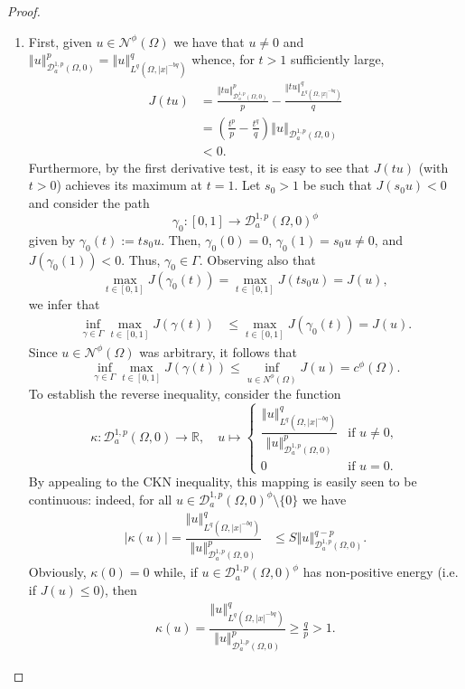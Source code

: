 \documentclass[10pt, reqno]{amsart}
\newcommand{\RR}{\mathbb{R}}
\newcommand{\Om}{\Omega}
\newcommand{\abs}[1]{\left\vert #1 \right\vert}
\newcommand{\norm}[1]{\left\Vert #1 \right\Vert}
\newcommand{\D}{\mathcal{D}}
\newcommand{\N}{\mathcal{N}}
\numberwithin{equation}{section}
\theoremstyle{definition}
\theoremstyle{remark}
\theoremstyle{plain}
\begin{document}
\begin{proof}
\begin{enumerate}[leftmargin=*]
			\item First, given $u \in \N^\phi(\Om)$ we have that $u \ne 0$ and $\norm{u}_{\D^{1,p}_a(\Om,0)}^p = \norm{u}_{L^q(\Om,\abs{x}^{-bq})}^q$ whence, for $t > 1$ sufficiently large, 
			\begin{align*}
				J(tu) &= \frac{\norm{tu}_{\D^{1,p}_a(\Om,0)}^p}{p} - \frac{\norm{tu}_{L^q(\Om,\abs{x}^{-bq})}^q}{q}\\
				&= \left( \frac{t^p}{p} - \frac{t^q}{q}\right) \norm{u}_{\D^{1,p}_a(\Om,0)} \\& < 0.
			\end{align*}
			Furthermore, by the first derivative test, it is easy to see that $J(tu)$ (with $t > 0$) achieves its maximum at $t=1$.
			Let $s_0 > 1$ be such that $J(s_0 u) < 0$ and consider the path $$\gamma_0 : [0,1] \to \D_a^{1,p}(\Om,0)^\phi$$ given by $\gamma_0(t) := ts_0u$. Then, $\gamma_0(0) = 0$, $\gamma_0(1) = s_0 u \ne 0$, and $J(\gamma_0(1)) < 0$. Thus, $\gamma_0 \in \Gamma$. Observing also that
			\[
			\max_{t \in [0,1]} J(\gamma_0(t)) = \max_{t \in [0,1]} J(ts_0u) = J(u), 
			\]
			we infer that
			\begin{align*}
				\inf_{\gamma \in \Gamma} \max_{t \in [0,1]} J(\gamma(t)) &\le \max_{t \in [0,1]} J(\gamma_0(t)) = J(u).
			\end{align*}
			Since $u \in \N^\phi(\Om)$ was arbitrary, it follows that
			\[
			\inf_{\gamma \in \Gamma} \max_{t \in [0,1]} J(\gamma(t))  \le \inf_{u \in N^\phi(\Om)} J(u) = c^\phi(\Om).
			\]
			To establish the reverse inequality, consider the function
			\[
			\kappa : \D_a^{1,p}(\Om,0) \to \RR, \quad u \mapsto \begin{cases} \dfrac{\norm{u}^{q}_{L^q(\Om,\abs{x}^{-bq})}}{\norm{u}^p_{\D^{1,p}_a(\Om,0)}} & \text{if } u \ne 0,\\ 0 & \text{if } u = 0. \end{cases}
			\]	
			By appealing to the CKN inequality, this mapping is easily seen to be continuous: indeed, for all $u \in \D_a^{1,p}(\Om,0)^\phi \setminus \{0\}$ we have
			\begin{align*}
				\abs{\kappa(u)} = \dfrac{\norm{u}^{q}_{L^q(\Om,\abs{x}^{-bq})}}{\norm{u}^p_{\D^{1,p}_a(\Om,0)}} &\le S\norm{u}^{q-p}_{\D^{1,p}_a(\Om,0)}.
			\end{align*}
			Obviously, $\kappa(0) =0$ while, if $u\in \D_a^{1,p}(\Om,0)^\phi$ has non-positive energy (i.e. if $J(u) \le 0$), then
			\begin{align*}
				\kappa(u) = \dfrac{\norm{u}^{q}_{L^q(\Om,\abs{x}^{-bq})}}{\norm{u}^p_{\D^{1,p}_a(\Om,0)}} \ge \frac{q}{p} > 1.

\end{align*}
\end{enumerate}
\end{proof}
\end{document}
